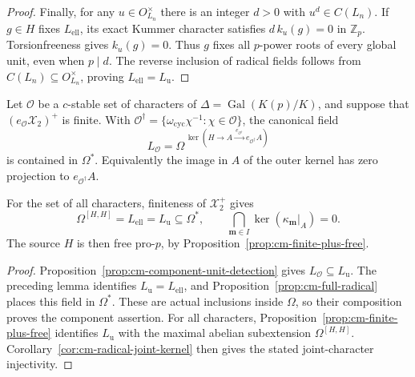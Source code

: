 \begin{proof}
Finally, for any \(u\in O_{L_n}^\times\) there is an integer
\(d>0\) with \(u^d\in C(L_n)\).
If \(g\in H\) fixes \(L_{\mathrm{ell}}\), its exact Kummer
character satisfies \(d\,k_u(g)=0\) in \(\mathbb Z_p\).
Torsionfreeness gives \(k_u(g)=0\).
Thus \(g\) fixes all \(p\)-power roots of every global unit,
even when \(p\mid d\).
The reverse inclusion of radical fields follows from
\(C(L_n)\subseteq O_{L_n}^\times\), proving
\(L_{\mathrm{ell}}=L_{\mathrm u}\).
\end{proof}

\begin{theorem}\label{thm:cm-finite-plus-abelian}
Let \(\mathcal O\) be a \(c\)-stable set of characters of
\(\Delta=\operatorname{Gal}(K(p)/K)\), and suppose that
\((e_{\mathcal O}\mathcal X_2)^+\) is finite.
With
\(\mathcal O^\dagger=\{\omega_{\mathrm{cyc}}\chi^{-1}:
                                         \chi\in\mathcal O\}\),
the canonical field
\[
 L_{\mathcal O}=
 \Omega^{\,\ker(H\longrightarrow A
                \xrightarrow{\,e_{\mathcal O^\dagger}\,}
                              e_{\mathcal O^\dagger}A)}
\]
is contained in \(\Omega^*\).
Equivalently the image in \(A\) of the outer kernel has
zero projection to \(e_{\mathcal O^\dagger}A\).

For the set of all characters, finiteness of
\(\mathcal X_2^+\) gives
\[
 \Omega^{[H,H]}=L_{\mathrm{ell}}=L_{\mathrm u}
                   \subseteq\Omega^*,\qquad
 \bigcap_{\boldsymbol m\in I}\ker(\kappa_{\boldsymbol m}|_A)=0.
\]
The source \(H\) is then free pro-\(p\), by
Proposition~\ref{prop:cm-finite-plus-free}.
\end{theorem}

\begin{proof}
Proposition~\ref{prop:cm-component-unit-detection} gives
\(L_{\mathcal O}\subseteq L_{\mathrm u}\).
The preceding lemma identifies
\(L_{\mathrm u}=L_{\mathrm{ell}}\), and
Proposition~\ref{prop:cm-full-radical} places this field in
\(\Omega^*\).
These are actual inclusions inside \(\Omega\), so their
composition proves the component assertion.
For all characters, Proposition~\ref{prop:cm-finite-plus-free}
identifies \(L_{\mathrm u}\) with the maximal abelian
subextension \(\Omega^{[H,H]}\).
Corollary~\ref{cor:cm-radical-joint-kernel} then gives the
stated joint-character injectivity.
\end{proof}
